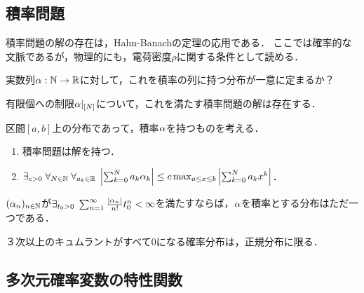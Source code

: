 \documentclass[uplatex,dvipdfmx]{jsreport}
\begin{document}
\begin{example}
    
\end{example}

\subsection{積率問題}

\begin{tcolorbox}[colframe=ForestGreen, colback=ForestGreen!10!white,breakable,colbacktitle=ForestGreen!40!white,coltitle=black,fonttitle=\bfseries\sffamily,
title=]
    積率問題の解の存在は，Hahn-Banachの定理の応用である．
    ここでは確率的な文脈であるが，物理的にも，電荷密度$\rho$に関する条件として読める．
\end{tcolorbox}

\begin{problem}
    実数列$\alpha:\mathbb{N}\to\mathbb{R}$に対して，これを積率の列に持つ分布が一意に定まるか？
\end{problem}

\begin{proposition}
    有限個への制限$\alpha|_{[N]}$について，これを満たす積率問題の解は存在する．
\end{proposition}

\begin{theorem}[存在の必要十分条件]
    区間$[a,b]$上の分布であって，積率$\alpha$を持つものを考える．
    \begin{enumerate}
        \item 積率問題は解を持つ．
        \item $\exists_{c>0}\;\forall_{N\in\mathbb{N}}\;\forall_{a_k\in\mathbb{R}}\;\left|\sum^N_{k=0}a_k\alpha_k\right|\le c\max_{a\le x\le b}\left|\sum^N_{k=0}a_kx^k\right|$．
    \end{enumerate}
\end{theorem}

\begin{theorem}[一意性の十分条件]
    $(\alpha_n)_{n\in\mathbb{N}}$が$\exists_{t_0>0}\;\sum^\infty_{n=1}\frac{\lvert\alpha_n\rvert}{n!}t^n_0<\infty$を満たすならば，$\alpha$を積率とする分布はただ一つである．
\end{theorem}

\begin{example}
    ３次以上のキュムラントがすべて$0$になる確率分布は，正規分布に限る．
\end{example}

\subsection{多次元確率変数の特性関数}
\end{document}
